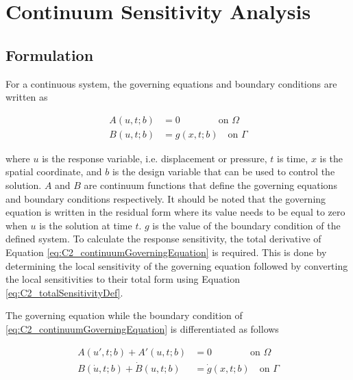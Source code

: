 \section{Continuum Sensitivity Analysis}
\subsection{Formulation}
For a continuous system, the governing equations and boundary conditions are written as

\begin{subequations}\label{eq:C2_continuumGoverningEquation}
\begin{align}
    A(u, t; b) &= 0 \qquad \qquad \text{on } \Omega \\
    B(u, t; b) &= g(x, t; b) \quad \text{on } \Gamma
\end{align}    
\end{subequations}

where $u$ is the response variable, i.e. displacement or pressure, $t$ is time, $x$ is the spatial coordinate, and $b$ is the design variable that can be used to control the solution. $A$ and $B$ are continuum functions that define the governing equations and boundary conditions respectively. It should be noted that the governing equation is written in the residual form where its value needs to be equal to zero when $u$ is the solution at time $t$. $g$ is the value of the boundary condition of the defined system. To calculate the response sensitivity, the total derivative of Equation \eqref{eq:C2_continuumGoverningEquation} is required. This is done by determining the local sensitivity of the governing equation followed by converting the local sensitivities to their total form using Equation \eqref{eq:C2_totalSensitivityDef}.

The governing equation while the boundary condition of \eqref{eq:C2_continuumGoverningEquation} is differentiated as follows

\begin{subequations}\label{eq:C2_continuumSensitivityFormulation}
\begin{align}
    A(u', t; b) + A'(u, t; b) &= 0 \qquad \qquad \text{on } \Omega \\
    B(\dot{u}, t; b) + \dot{B}(u, t; b) &= \dot{g}(x, t; b) \quad \text{on } \Gamma
\end{align}    
\end{subequations}

